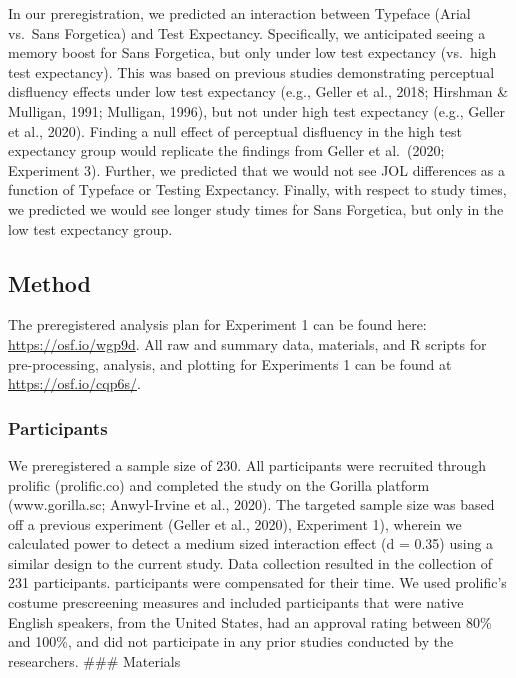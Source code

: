 \documentclass[
  english,
  jou]{apa7}
\begin{document}
In our preregistration, we predicted an interaction between Typeface (Arial vs.~Sans Forgetica) and Test Expectancy. Specifically, we anticipated seeing a memory boost for Sans Forgetica, but only under low test expectancy (vs.~high test expectancy). This was based on previous studies demonstrating perceptual disfluency effects under low test expectancy (e.g., Geller et al., 2018; Hirshman \& Mulligan, 1991; Mulligan, 1996), but not under high test expectancy (e.g., Geller et al., 2020). Finding a null effect of perceptual disfluency in the high test expectancy group would replicate the findings from Geller et al.~(2020; Experiment 3). Further, we predicted that we would not see JOL differences as a function of Typeface or Testing Expectancy. Finally, with respect to study times, we predicted we would see longer study times for Sans Forgetica, but only in the low test expectancy group.

\hypertarget{method}{%
\subsection{Method}\label{method}}

The preregistered analysis plan for Experiment 1 can be found here: \url{https://osf.io/wgp9d}. All raw and summary data, materials, and R scripts for pre-processing, analysis, and plotting for Experiments 1 can be found at \url{https://osf.io/cqp6s/}.

\hypertarget{participants}{%
\subsubsection{Participants}\label{participants}}

We preregistered a sample size of 230. All participants were recruited through prolific (prolific.co) and completed the study on the Gorilla platform (www.gorilla.sc; Anwyl-Irvine et al., 2020). The targeted sample size was based off a previous experiment (Geller et al., 2020), Experiment 1), wherein we calculated power to detect a medium sized interaction effect (d = 0.35) using a similar design to the current study. Data collection resulted in the collection of 231 participants. participants were compensated for their time. We used prolific's costume prescreening measures and included participants that were native English speakers, from the United States, had an approval rating between 80\% and 100\%, and did not participate in any prior studies conducted by the researchers.
\#\#\# Materials
\end{document}
